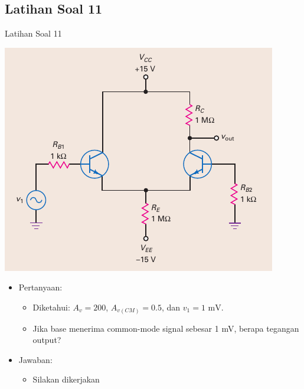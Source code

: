 \documentclass[aspectratio=169]{beamer}
\begin{document}
\subsection{Latihan Soal 11}
\begin{frame}{Latihan Soal 11}
	\begin{multicols}{2}
		\begin{center}
			\includegraphics[width=\linewidth, height=0.7\textheight]{gambar/01.diff-amp/01.fig22}
		\end{center}
		\columnbreak
		\begin{itemize}
			\item Pertanyaan:
			\begin{itemize}
				\item Diketahui: $ A_v = 200 $, $ A_{v(CM)} = 0.5 $, dan $ v_1 = 1 \text{ mV} $.
				\item Jika base menerima common-mode signal sebesar 1 mV, berapa tegangan output?
			\end{itemize}
			\item Jawaban:
			\begin{itemize}
				\item Silakan dikerjakan
			\end{itemize}
		\end{itemize}
	\end{multicols}
\end{frame}
\end{document}
